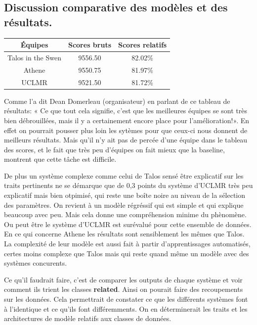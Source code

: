 \documentclass[11pt,a4paper,oldfontcommands]{memoir}
\begin{document}
\subsection{Discussion comparative des modèles et des résultats.}
\begin{center}
 \begin{tabular}{| c || c | c | }
  \hline
  \textbf{Équipes}  & \textbf{Scores bruts} & \textbf{Scores relatifs} \\
  \hline
  Talos in the Swen & 9556.50               & 82.02\%                  \\
  Athene            & 9550.75               & 81.97\%                  \\
  UCLMR             & 9521.50               & 81.72\%                  \\
  \hline
 \end{tabular}
\end{center}

Comme l'a dit Dean Domerleau (organisateur) en parlant de ce tableau de résultats: « Ce que tout cela signifie, c'est que les meilleures équipes se sont très bien débrouillées, mais il y a certainement encore place pour l'amélioration!».
En effet on pourrait pousser plus loin les sytèmes pour que ceux-ci nous donnent de meilleurs résultats.
Mais qu'il n'y ait pas de percée d'une équipe dans le tableau des scores, et le fait que très peu d'équipes on fait mieux que la baseline, montrent que cette tâche est difficile.

De plus un système complexe comme celui de Talos sensé être explicatif sur les traits pertinents ne se démarque que de 0,3 points du système d'UCLMR très peu explicatif mais bien otpimisé, qui reste une boîte noire au niveau de la sélection des paramètres.
On revient à un modèle régréssif qui est simple et qui explique beaucoup avec peu.
Mais cela donne une compréhension minime du phènomène.
Ou peut être le système d'UCLMR est surévalué pour cette ensemble de données.
En ce qui concerne Athene les résultats sont sensiblement les mêmes que Talos.
La complexité de leur modèle est aussi fait à partir d'apprentissages automatisés, certes moins complexe que Talos mais qui reste quand même un modèle avec des systèmes concurents.

Ce qu'il faudrait faire, c'est de comparer les outputs de chaque système et voir comment ils trient les classes \textbf{related}.
Ainsi on pourait faire des recoupements sur les données.
Cela permettrait de constater ce que les différents systèmes font à l'identique et ce qu'ils font différemments.
On en déterminerait les traits et les architectures de modèle relatifs aux classes de données.
\end{document}

